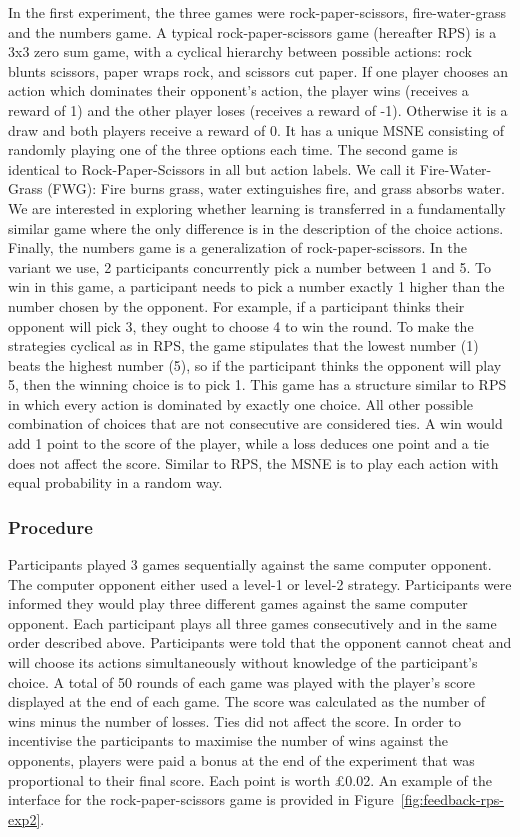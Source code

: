 \documentclass[man,floatsintext]{apa6}
\begin{document}
In the first experiment, the three games were rock-paper-scissors, fire-water-grass and the numbers game. A typical rock-paper-scissors game (hereafter RPS) is a 3x3 zero sum game, with a cyclical hierarchy between possible actions: rock blunts scissors, paper wraps rock, and scissors cut paper. If one player chooses an action which dominates their opponent's action, the player wins (receives a reward of 1) and the other player loses (receives a reward of -1). Otherwise it is a draw and both players receive a reward of 0. It has a unique MSNE consisting of randomly playing one of the three options each time. The second game is identical to Rock-Paper-Scissors in all but action labels. We call it Fire-Water-Grass (FWG): Fire burns grass, water extinguishes fire, and grass absorbs water. We are interested in exploring whether learning is transferred in a fundamentally similar game where the only difference is in the description of the choice actions. Finally, the numbers game is a generalization of rock-paper-scissors. In the variant we use, 2 participants concurrently pick a number between 1 and 5. To win in this game, a participant needs to pick a number exactly 1 higher than the number chosen by the opponent. For example, if a participant thinks their opponent will pick 3, they ought to choose 4 to win the round. To make the strategies cyclical as in RPS, the game stipulates that the lowest number (1) beats the highest number (5), so if the participant thinks the opponent will play 5, then the winning choice is to pick 1. This game has a structure similar to RPS in which every action is dominated by exactly one choice. All other possible combination of choices that are not consecutive are considered ties. A win would add 1 point to the score of the player, while a loss deduces one point and a tie does not affect the score. Similar to RPS, the MSNE is to play each action with equal probability in a random way.

\hypertarget{procedure}{%
\subsubsection{Procedure}\label{procedure}}

Participants played 3 games sequentially against the same computer opponent. The computer opponent either used a level-1 or level-2 strategy. Participants were informed they would play three different games against the same computer opponent. Each participant plays all three games consecutively and in the same order described above. Participants were told that the opponent cannot cheat and will choose its actions simultaneously without knowledge of the participant's choice. A total of 50 rounds of each game was played with the player's score displayed at the end of each game. The score was calculated as the number of wins minus the number of losses. Ties did not affect the score. In order to incentivise the participants to maximise the number of wins against the opponents, players were paid a bonus at the end of the experiment that was proportional to their final score. Each point is worth £0.02. An example of the interface for the rock-paper-scissors game is provided in Figure~\ref{fig:feedback-rps-exp2}.
\end{document}
